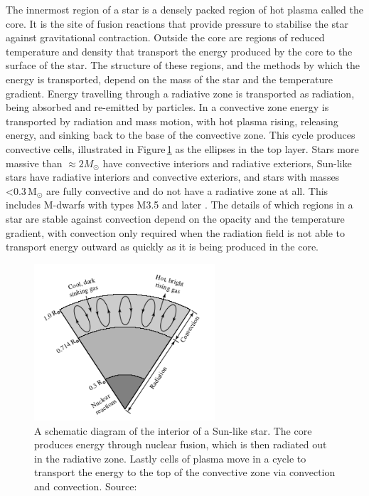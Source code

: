 The innermost region of a star is a densely packed region of hot plasma called the core. It is the site of fusion reactions that provide pressure to stabilise the star against gravitational contraction. Outside the core are regions of reduced temperature and density that transport the energy produced by the core to the surface of the star. The structure of these regions, and the methods by which the energy is transported, depend on the mass of the star and the temperature gradient. Energy travelling through a radiative zone is transported as radiation, being absorbed and re-emitted by particles. In a convective zone energy is transported by radiation and mass motion, with hot plasma rising, releasing energy, and sinking back to the base of the convective zone. This cycle produces convective cells, illustrated in Figure\,\ref{figEnergyTrans} as the ellipses in the top layer. Stars more massive than $\approx 2 M_{\odot}$ have convective interiors and radiative exteriors, Sun-like stars have radiative interiors and convective exteriors, and stars with masses \textless0.3\,M$_\odot$ are fully convective and do not have a radiative zone at all. This includes M-dwarfs with types M3.5 and later \citep{2008West}. The details of which regions in a star are stable against convection depend on the opacity and the temperature gradient, with convection only required when the radiation field is not able to transport energy outward as quickly as it is being produced in the core.\\

\begin{figure}
    \centering
    \includegraphics[width=0.6\textwidth]{Convection.png}
    \caption{A schematic diagram of the interior of a Sun-like star. The core produces energy through nuclear fusion, which is then radiated out in the radiative zone. Lastly cells of plasma move in a cycle to transport the energy to the top of the convective zone via convection and convection. Source: \citet{2006Carroll}}
    \label{figEnergyTrans}
\end{figure}


